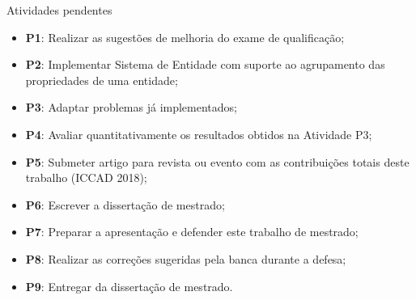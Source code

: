 \begin{frame}{Atividades pendentes}
    \begin{itemize}
        \item \textbf{P1}: Realizar as sugestões de melhoria do exame de qualificação;
        \item \textbf{P2}: Implementar Sistema de Entidade com suporte ao agrupamento das propriedades de uma entidade;
        \item \textbf{P3}: Adaptar problemas já implementados;
        \item \textbf{P4}: Avaliar quantitativamente os resultados obtidos na Atividade P3;
        \item \textbf{P5}: Submeter artigo para revista ou evento com as contribuições totais deste trabalho (ICCAD 2018);
        \item \textbf{P6}: Escrever a dissertação de mestrado;
        \item \textbf{P7}: Preparar a apresentação e defender este trabalho de mestrado;
        \item \textbf{P8}: Realizar as correções sugeridas pela banca durante a defesa;
        \item \textbf{P9}: Entregar da dissertação de mestrado.
    \end{itemize}
\end{frame}

